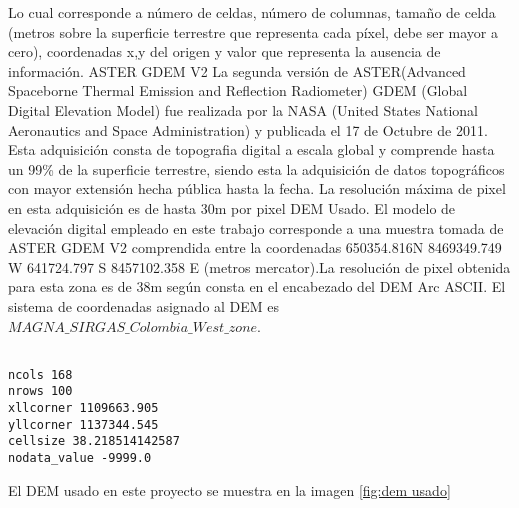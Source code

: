 Lo cual corresponde a n\'{u}mero de celdas, n\'{u}mero de columnas, tama\~{n}o de celda (metros
sobre la superficie terrestre que representa cada p\'{i}xel, debe ser mayor a cero),
coordenadas x,y del origen y valor que representa la ausencia de informaci\'{o}n.
ASTER GDEM V2
La segunda versi\'{o}n de ASTER(Advanced Spaceborne Thermal Emission and Reflection
Radiometer) GDEM (Global Digital Elevation Model) fue realizada por la NASA (United
States National Aeronautics and Space Administration) y publicada el 17 de Octubre de
2011. Esta adquisici\'{o}n consta de topografia digital a escala global y comprende hasta un
99\% de la superficie terrestre, siendo esta la adquisici\'{o}n de datos topogr\'{a}ficos con mayor
extensi\'{o}n hecha p\'{u}blica hasta la fecha.
La resoluci\'{o}n m\'{a}xima de pixel en esta adquisici\'{o}n es de hasta 30m por pixel
DEM Usado.
El modelo de elevaci\'{o}n digital empleado en este trabajo corresponde a una muestra tomada
de ASTER GDEM V2 comprendida entre la coordenadas 650354.816N 8469349.749 W
641724.797 S 8457102.358 E (metros mercator).La resoluci\'{o}n de pixel obtenida para esta
zona es de 38m seg\'{u}n consta en el encabezado del DEM Arc ASCII. El sistema de
coordenadas asignado al DEM es $ MAGNA\_SIRGAS\_Colombia\_West\_zone$.\par

\begin{lstlisting}

ncols 168
nrows 100
xllcorner 1109663.905
yllcorner 1137344.545
cellsize 38.218514142587
nodata_value -9999.0
\end{lstlisting}

El DEM usado en este proyecto se muestra en la imagen \ref{fig:dem usado}